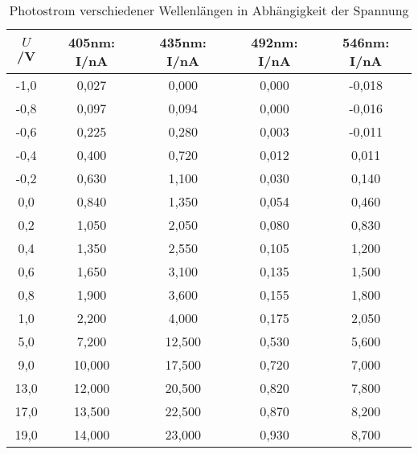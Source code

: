 \begin{table}[h]
	\begin{center}
		\begin{tabular}{c|cccc}
			$U$/V&405nm: I/nA&435nm: I/nA&492nm: I/nA&546nm: I/nA \\ \hline
			-1,0&	0,027& 0,000&0,000&-0,018\\
			-0,8&	0,097& 0,094&0,000&-0,016\\
			-0,6&	0,225& 0,280&0,003&-0,011\\
			-0,4&	0,400& 0,720&0,012& 0,011\\
			-0,2&	0,630& 1,100&0,030& 0,140\\
			 0,0&	0,840& 1,350&0,054& 0,460\\
			 0,2&	1,050& 2,050&0,080& 0,830\\
			 0,4&	1,350& 2,550&0,105& 1,200\\
			 0,6&	1,650& 3,100&0,135& 1,500\\
			 0,8&	1,900& 3,600&0,155& 1,800\\
			 1,0&	2,200& 4,000&0,175& 2,050\\
			 5,0&	7,200&12,500&0,530& 5,600\\
			 9,0&  10,000&17,500&0,720& 7,000\\
			13,0&  12,000&20,500&0,820& 7,800\\
			17,0&  13,500&22,500&0,870& 8,200\\
			19,0&  14,000&23,000&0,930& 8,700
		\end{tabular}
		\caption{Photostrom verschiedener Wellenlängen in Abhängigkeit der Spannung}
		\label{tabaall}
	\end{center}
\end{table}